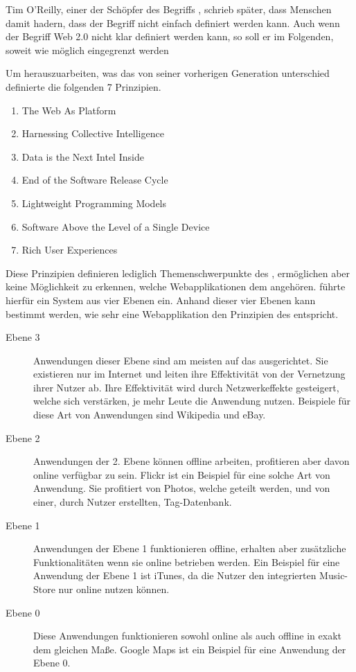Tim O'Reilly, einer der Schöpfer des Begriffs , schrieb später, dass Menschen damit hadern, dass der Begriff  nicht einfach definiert werden kann. \parencite{oreilly:levels-of-web20} Auch wenn der Begriff Web 2.0 nicht klar definiert werden kann, so soll er im Folgenden, soweit wie möglich eingegrenzt werden

Um herauszuarbeiten, was das  von seiner vorherigen Generation unterschied definierte \textcite{oreilly:web20} die folgenden 7 Prinzipien.

\begin{enumerate}
	\item The Web As Platform
	\item Harnessing Collective Intelligence
	\item Data is the Next Intel Inside
	\item End of the Software Release Cycle
	\item Lightweight Programming Models
	\item Software Above the Level of a Single Device
	\item Rich User Experiences
\end{enumerate}

Diese Prinzipien definieren lediglich Themenschwerpunkte des , ermöglichen aber keine Möglichkeit zu erkennen, welche Webapplikationen dem  angehören. \textcite{oreilly:levels-of-web20} führte hierfür ein System aus vier Ebenen ein. Anhand dieser vier Ebenen kann bestimmt werden, wie sehr eine Webapplikation den Prinzipien des  entspricht.

\begin{description}
\item[Ebene 3] Anwendungen dieser Ebene sind am meisten auf das  ausgerichtet. Sie existieren nur im Internet und leiten ihre Effektivität von der Vernetzung ihrer Nutzer ab. Ihre Effektivität wird durch Netzwerkeffekte gesteigert, welche sich verstärken, je mehr Leute die Anwendung nutzen. Beispiele für diese Art von Anwendungen sind Wikipedia und eBay.
\item[Ebene 2] Anwendungen der 2. Ebene können offline arbeiten, profitieren aber davon online verfügbar zu sein. Flickr ist ein Beispiel für eine solche Art von Anwendung. Sie profitiert von Photos, welche geteilt werden, und von einer, durch Nutzer erstellten, Tag-Datenbank.
\item[Ebene 1] Anwendungen der Ebene 1 funktionieren offline, erhalten aber zusätzliche Funktionalitäten wenn sie online betrieben werden. Ein Beispiel für eine Anwendung der Ebene 1 ist iTunes, da die Nutzer den integrierten Music-Store nur online nutzen können.
\item[Ebene 0] Diese Anwendungen funktionieren sowohl online als auch offline in exakt dem gleichen Maße. Google Maps ist ein Beispiel für eine Anwendung der Ebene 0.
\end{description}

